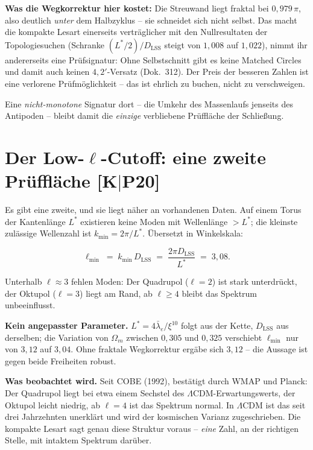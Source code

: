 \textbf{Was die Wegkorrektur hier kostet:} Die Streuwand liegt
fraktal bei $0{,}979\,\pi$, also deutlich \emph{unter} dem
Halbzyklus -- sie schneidet sich nicht selbst. Das macht die
kompakte Lesart einerseits verträglicher mit den Nullresultaten
der Topologiesuchen (Schranke $(L^{*}/2)/D_\text{LSS}$ steigt von
$1{,}008$ auf $1{,}022$), nimmt ihr andererseits eine
Prüfsignatur: Ohne Selbstschnitt gibt es keine Matched Circles und
damit auch keinen $4{,}2'$-Versatz (Dok.~312). Der Preis der
besseren Zahlen ist eine verlorene Prüfmöglichkeit -- das ist
ehrlich zu buchen, nicht zu verschweigen.

Eine \emph{nicht-monotone} Signatur dort -- die Umkehr des
Massenlaufs jenseits des Antipoden -- bleibt damit die
\emph{einzige} verbliebene Prüffläche der Schließung.

\section{Der Low-$\ell$-Cutoff: eine zweite Prüffläche [K$|$P20]}

Es gibt eine zweite, und sie liegt näher an vorhandenen Daten. Auf
einem Torus der Kantenlänge $L^{*}$ existieren keine Moden mit
Wellenlänge $> L^{*}$; die kleinste zulässige Wellenzahl ist
$k_\text{min} = 2\pi/L^{*}$. Übersetzt in Winkelskala:

\begin{equation}
  \ell_\text{min} \;=\; k_\text{min}\,D_\text{LSS}
  \;=\; \frac{2\pi D_\text{LSS}}{L^{*}} \;=\; 3{,}08 .
\end{equation}

\noindent Unterhalb $\ell \approx 3$ fehlen Moden: Der Quadrupol
($\ell = 2$) ist stark unterdrückt, der Oktupol ($\ell = 3$) liegt
am Rand, ab $\ell \ge 4$ bleibt das Spektrum unbeeinflusst.

\textbf{Kein angepasster Parameter.} $L^{*} = 4\bar\lambda_e/
\xi^{10}$ folgt aus der Kette, $D_\text{LSS}$ aus derselben; die
Variation von $\Omega_m$ zwischen $0{,}305$ und $0{,}325$
verschiebt $\ell_\text{min}$ nur von $3{,}12$ auf $3{,}04$. Ohne
fraktale Wegkorrektur ergäbe sich $3{,}12$ -- die Aussage ist
gegen beide Freiheiten robust.

\textbf{Was beobachtet wird.} Seit COBE (1992), bestätigt durch
WMAP und Planck: Der Quadrupol liegt bei etwa einem Sechstel des
$\Lambda$CDM-Erwartungswerts, der Oktupol leicht niedrig, ab
$\ell = 4$ ist das Spektrum normal. In $\Lambda$CDM ist das seit
drei Jahrzehnten unerklärt und wird der kosmischen Varianz
zugeschrieben. Die kompakte Lesart sagt genau diese Struktur
voraus -- \emph{eine} Zahl, an der richtigen Stelle, mit intaktem
Spektrum darüber.

